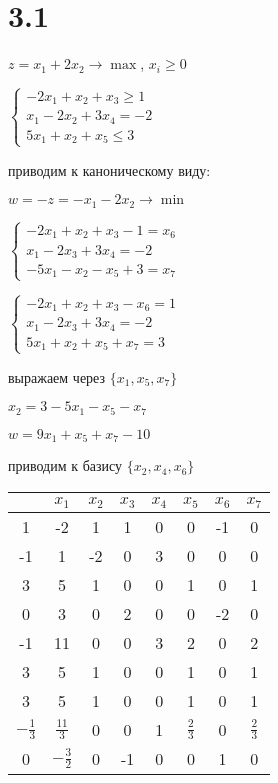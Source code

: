 \documentclass[russian]{article}
\begin{document}
\section*{3.1}

$z=x_1 + 2 x_2 \to \max$, $x_i \ge 0$

$\begin{cases}
-2 x_1 + x_2 + x_3 \ge 1 \\
x_1 - 2 x_2 + 3 x_4 = -2 \\
5 x_1 + x_2 + x_5 \le 3
\end{cases}$

приводим к каноническому виду:

$w = -z = -x _1 - 2x_2 \to \min$

$\begin{cases}
-2 x_1 + x_2 + x_3 - 1 = x_6 \\
x _1 - 2 x_3 + 3 x_4 = -2 \\
-5 x_1 - x_2 - x_5 + 3 = x_7 
\end{cases}$

$\begin{cases}
-2 x_1 + x_2 + x_3 - x_6 = 1 \\
x _1 - 2 x_3 + 3 x_4 = -2 \\
5 x_1 + x_2 + x_5 + x_7 = 3
\end{cases}$

выражаем через $\{x_1, x_5, x_7\}$

$x_2 = 3 - 5 x_1 - x_5 - x_7$

$w = 9 x_1 + x_5 + x_7 - 10$

приводим к базису $\{x_2, x_4, x_6\}$

\begin{tabular}{|c|ccccccc|}\hline
& $x_1$ & $x_2$ & $x_3$ & $x_4$ & $x_5$ & $x_6$ & $x_7$ \\\hline
1 & -2 & 1 & 1 & 0 & 0 & -1 & 0 \\
-1 & 1 & -2 & 0 & 3 & 0 & 0 & 0 \\
3 & 5 & 1 & 0 & 0 & 1 & 0 & 1 \\\hline

0 & 3 & 0 & 2 & 0 & 0 & -2 & 0 \\
-1 & 11 & 0 & 0 & 3 & 2 & 0 & 2 \\
3 & 5 & 1 & 0 & 0 & 1 & 0 & 1 \\\hline

3 & 5 & 1 & 0 & 0 & 1 & 0 & 1 \\
$-\frac{1}{3}$ & $\frac{11}{3}$ & 0 & 0 & 1 & $\frac{2}{3}$ & 0 & $\frac{2}{3}$ \\
0 & $-\frac{3}{2}$ & 0 & -1 & 0 & 0 & 1 & 0 \\\hline
\end{tabular}
\end{document}
